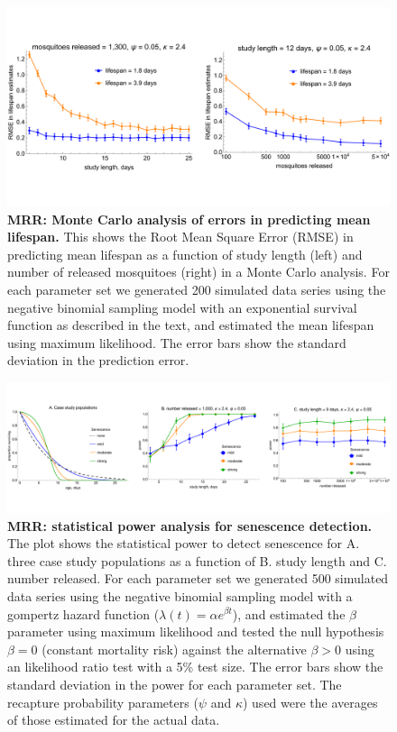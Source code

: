 \documentclass[12pt]{article}
\begin{document}
\begin{figure}[ht]
	\centerline{\includegraphics[width=1.25\textwidth]{./Figure_files/mrr_mcPowerAnalysis.pdf}}
	\caption{\textbf{MRR: Monte Carlo analysis of errors in predicting mean lifespan.} This shows the Root Mean Square Error (RMSE) in predicting mean lifespan as a function of study length (left) and number of released mosquitoes (right) in a Monte Carlo analysis. For each parameter set we generated 200 simulated data series using the negative binomial sampling model with an exponential survival function as described in the text, and estimated the mean lifespan using maximum likelihood. The error bars show the standard deviation in the prediction error.}
	\label{fig:mrr_mcPowerAnalysis}
\end{figure}

\begin{figure}[ht]
	\centerline{\includegraphics[width=1.25\textwidth]{./Figure_files/mrr_mcPowerAnalysis_senescence.pdf}}
	\caption{\textbf{MRR: statistical power analysis for senescence detection.} The plot shows the statistical power to detect senescence for A. three case study populations as a function of B. study length and C. number released. For each parameter set we generated 500 simulated data series using the negative binomial sampling model with a gompertz hazard function ($\lambda(t) = \alpha e^{\beta t}$), and estimated the $\beta$ parameter using maximum likelihood and tested the null hypothesis $\beta=0$ (constant mortality risk) against the alternative $\beta>0$ using an likelihood ratio test with a 5\% test size. The error bars show the standard deviation in the power for each parameter set. The recapture probability parameters ($\psi$ and $\kappa$) used were the averages of those estimated for the actual data.}
	\label{fig:mrr_mcPowerAnalysis_senescence}
\end{figure}




\end{document}

